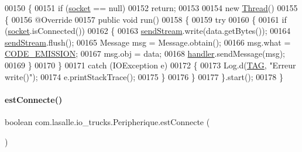 \begin{DoxyCode}
00150     \{
00151         \textcolor{keywordflow}{if} (\hyperlink{classcom_1_1lasalle_1_1io__trucks_1_1_peripherique_ac5f2ba9eadd31a1f08f745e68476d238}{socket} == null)
00152             \textcolor{keywordflow}{return};
00153 
00154         \textcolor{keyword}{new} \hyperlink{class_thread}{Thread}()
00155         \{
00156             @Override
00157             \textcolor{keyword}{public} \textcolor{keywordtype}{void} run()
00158             \{
00159                 \textcolor{keywordflow}{try}
00160                 \{
00161                     \textcolor{keywordflow}{if} (\hyperlink{classcom_1_1lasalle_1_1io__trucks_1_1_peripherique_ac5f2ba9eadd31a1f08f745e68476d238}{socket}.isConnected())
00162                     \{
00163                         \hyperlink{classcom_1_1lasalle_1_1io__trucks_1_1_peripherique_a57c51f49b9b0ce3b68a257a96198106b}{sendStream}.write(data.getBytes());
00164                         \hyperlink{classcom_1_1lasalle_1_1io__trucks_1_1_peripherique_a57c51f49b9b0ce3b68a257a96198106b}{sendStream}.flush();
00165                         Message msg = Message.obtain();
00166                         msg.what = \hyperlink{classcom_1_1lasalle_1_1io__trucks_1_1_peripherique_aad9e383353fd86265a2eeeac2d2c901f}{CODE\_EMISSION};
00167                         msg.obj = data;
00168                         \hyperlink{classcom_1_1lasalle_1_1io__trucks_1_1_peripherique_afc44cb5a50cb29c450ef962efc735532}{handler}.sendMessage(msg);
00169                     \}
00170                 \}
00171                 \textcolor{keywordflow}{catch} (IOException e)
00172                 \{
00173                     Log.d(\hyperlink{classcom_1_1lasalle_1_1io__trucks_1_1_peripherique_a9ad17604c5e0a0ca93908a76af9db6cc}{TAG}, \textcolor{stringliteral}{"Erreur write()"});
00174                     e.printStackTrace();
00175                 \}
00176             \}
00177         \}.start();
00178     \}
\end{DoxyCode}
\mbox{\label{classcom_1_1lasalle_1_1io__trucks_1_1_peripherique_a53878a13cdb7b3d8fa8e7c97cb0287f0}} 
\paragraph{\texorpdfstring{est\+Connecte()}{estConnecte()}}
{\footnotesize\ttfamily boolean com.\+lasalle.\+io\+\_\+trucks.\+Peripherique.\+est\+Connecte (\begin{DoxyParamCaption}{ }\end{DoxyParamCaption})}



